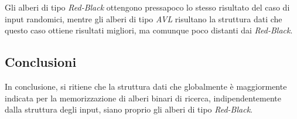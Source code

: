 \documentclass[11pt,a4paper,italian]{article}
\begin{document}
Gli alberi di tipo \textit{Red-Black} ottengono pressapoco lo stesso risultato del caso di input randomici, mentre gli alberi di tipo \textit{AVL} risultano la struttura dati che questo caso ottiene risultati migliori, ma comunque poco distanti dai \textit{Red-Black}.

\subsection{Conclusioni}
In conclusione, si ritiene che la struttura dati che globalmente è maggiormente indicata per la memorizzazione di alberi binari di ricerca, indipendentemente dalla struttura degli input, siano proprio gli alberi di tipo \textit{Red-Black}.
\end{document}
